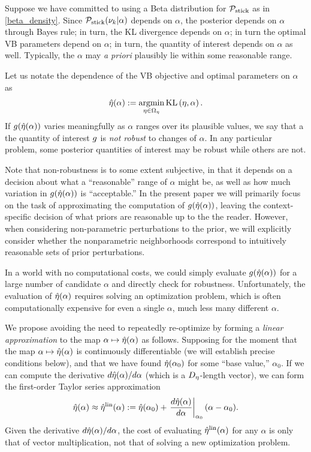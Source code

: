 Suppose we have committed to using a Beta distribution for $\mathcal{P}_{\mathrm{stick}}$ as in
\eqref{beta_density}. Since $\mathcal{P}_{\mathrm{stick}}(\nu_{k} \vert \alpha)$ depends on $\alpha$,
the posterior depends on $\alpha$ through Bayes rule; in turn, the KL divergence
depends on $\alpha$; in turn the optimal VB parameters depend on $\alpha$; in
turn, the quantity of interest depends on $\alpha$ as well. Typically, the
$\alpha$ may {\em a priori} plausibly lie within some reasonable range.

Let us notate the dependence of the VB objective and optimal parameters on
$\alpha$ as
%
\begin{align*}
%
\etaopt(\alpha) := \argmin_{\eta \in \etadom} \KL{\eta, \alpha}.
%
\end{align*}
%
If $g(\hat\eta(\alpha))$ varies meaningfully as $\alpha$ ranges over its
plausible values, we say that a the quantity of interest $g$ is {\em not
robust} to changes of $\alpha$.  In any particular problem, some posterior
quantities of interest may be robust while others are not.

Note that non-robustness is to some extent subjective, in that it depends on a
decision about what a ``reasonable'' range of $\alpha$ might be, as well as how
much variation in $g(\hat\eta(\alpha))$ is ``acceptable.''  In the present paper
we will primarily focus on the task of approximating the computation of
$g(\hat\eta(\alpha))$, leaving the context-specific decision of what priors are
reasonable up to the the reader.  However, when considering non-parametric
perturbations to the prior, we will explicitly consider whether the
nonparametric neighborhoods correspond to intuitively reasonable sets of prior
perturbations.

In a world with no computational costs, we could simply evaluate
$g(\hat\eta(\alpha))$ for a large number of candidate $\alpha$ and directly
check for robustness.  Unfortunately, the evaluation of $\hat\eta(\alpha)$
requires solving an optimization problem, which is often computationally
expensive for even a single $\alpha$, much less many different $\alpha$.

We propose avoiding the need to repeatedly re-optimize by forming a {\em linear
approximation} to the map $\alpha \mapsto \hat\eta(\alpha)$ as follows. Supposing
for the moment that the map $\alpha \mapsto \hat\eta(\alpha)$ is continuously
differentiable (we will establish precise conditions below), and that we have
found $\hat\eta(\alpha_0)$ for some ``base value,'' $\alpha_0$.  If we can
compute the derivative $d \hat\eta(\alpha) / d\alpha$ (which is a
${D_{\eta}}$-length vector), we can form the first-order Taylor series
approximation
%
\begin{align*}
%
\etaopt(\alpha) \approx \etalin(\alpha) :={}
    \etaopt(\alpha_0) +
    \fracat{d \etaopt(\alpha)}{d\alpha}{\alpha_0} (\alpha - \alpha_0).
%
\end{align*}
%
Given the derivative $d \hat\eta(\alpha) / d\alpha$, the cost of evaluating
$\hat\eta^{\mathrm{lin}}(\alpha)$ for any $\alpha$ is only that of vector multiplication, not
that of solving a new optimization problem.

